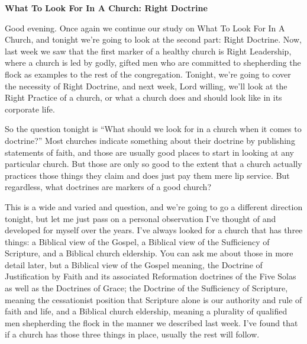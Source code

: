 \documentclass[letterpaper, 12pt]{article}
\begin{document}
    \thispagestyle{empty}

    \begin{center}

        \textbf{\large{What To Look For In A Church: Right Doctrine}}

    \end{center}

    Good evening. Once again we continue our study on What To Look For
    In A Church, and tonight we're going to look at the second part:
    Right Doctrine. Now, last week we saw that the first marker of a
    healthy church is Right Leadership, where a church is led by godly,
    gifted men who are committed to shepherding the flock as examples to
    the rest of the congregation. Tonight, we're going to cover the
    necessity of Right Doctrine, and next week, Lord willing, we'll look
    at the Right Practice of a church, or what a church does and should
    look like in its corporate life.

    So the question tonight is ``What should we look for in a church
    when it comes to doctrine?'' Most churches indicate something about
    their doctrine by publishing statements of faith, and those are
    usually good places to start in looking at any particular church.
    But those are only so good to the extent that a church actually
    practices those things they claim and does just pay them mere lip
    service. But regardless, what doctrines are markers of a good
    church? 

    This is a wide and varied and question, and we're going to go a
    different direction tonight, but let me just pass on a personal
    observation I've thought of and developed for myself over the years.
    I've always looked for a church that has three things: a Biblical
    view of the Gospel, a Biblical view of the Sufficiency of Scripture,
    and a Biblical church eldership. You can ask me about those in more
    detail later, but a Biblical view of the Gospel meaning, the
    Doctrine of Justification by Faith and its associated Reformation
    doctrines of the Five Solas as well as the Doctrines of Grace; the
    Doctrine of the Sufficiency of Scripture, meaning the cessationist
    position that Scripture alone is our authority and rule of faith and
    life, and a Biblical church eldership, meaning a plurality of
    qualified men shepherding the flock in the manner we described last
    week. I've found that if a church has those three things in place,
    usually the rest will follow.
\end{document}
